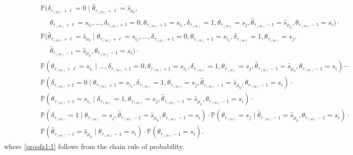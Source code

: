 \documentclass[journal,twoside,web]{ieeecolor}
\begin{document}
\begin{figure*}[ht]
\begin{align}
\begin{aligned}
& \qquad\quad~~~\! \mathbb{P}(\delta_{\tau_{(m)}+\ell}=0 \mid \hat{\theta}_{\tau_{(m)}+\ell} = \hat{s}_{\nu_{0}}, \\
& \qquad\qquad\quad\! \theta_{\tau_{(m)}+\ell}=s_{i_{\ell}},\dots,
\delta_{\tau_{(m)}+1}=0,\theta_{\tau_{(m)}+1}=s_{i_{1}},\delta_{\tau_{(m)}}=1,\theta_{\tau_{(m)}}=s_j,\hat{\theta}_{\tau_{(m)}-1} = \hat{s}_{\mu_0}, \theta_{\tau_{(m)}-1}=s_i) \cdot \\
& \qquad\quad~~~\! \mathbb{P}(\hat{\theta}_{\tau_{(m)}+\ell} = \hat{s}_{\nu_{0}} \mid \theta_{\tau_{(m)}+\ell}=s_{i_{\ell}},\dots,
\delta_{\tau_{(m)}+1}=0,\theta_{\tau_{(m)}+1}=s_{i_{1}},\delta_{\tau_{(m)}}=1,\theta_{\tau_{(m)}}=s_j,\\
& \qquad\qquad\quad\! \hat{\theta}_{\tau_{(m)}-1} = \hat{s}_{\mu_0}, \theta_{\tau_{(m)}-1}=s_i) \cdot \\
& \qquad\quad~~~\! \mathbb{P}(\theta_{\tau_{(m)}+\ell}=s_{i_{\ell}} \mid \dots, \delta_{\tau_{(m)}+1}=0,\theta_{\tau_{(m)}+1}=s_{i_{1}},\delta_{\tau_{(m)}}=1,\theta_{\tau_{(m)}}=s_j,\hat{\theta}_{\tau_{(m)}-1} = \hat{s}_{\mu_0}, \theta_{\tau_{(m)}-1}=s_i) \cdots \\
& \qquad\quad~~~\! \mathbb{P}(\delta_{\tau_{(m)}+1}=0 \mid \theta_{\tau_{(m)}+1}=s_{i_{1}},\delta_{\tau_{(m)}}=1,\theta_{\tau_{(m)}}=s_j,\hat{\theta}_{\tau_{(m)}-1} = \hat{s}_{\mu_0}, \theta_{\tau_{(m)}-1}=s_i) \cdot \\
& \qquad\quad~~~\! \mathbb{P}(\theta_{\tau_{(m)}+1}=s_{i_{1}} \mid \delta_{\tau_{(m)}}=1,\theta_{\tau_{(m)}}=s_j,\hat{\theta}_{\tau_{(m)}-1} = \hat{s}_{\mu_0}, \theta_{\tau_{(m)}-1}=s_i) \cdot \\
& \qquad\quad~~~\! \mathbb{P}(\delta_{\tau_{(m)}}=1 \mid \theta_{\tau_{(m)}}=s_j,\hat{\theta}_{\tau_{(m)}-1} = \hat{s}_{\mu_0}, \theta_{\tau_{(m)}-1}=s_i) \cdot
\mathbb{P}(\theta_{\tau_{(m)}}=s_j \mid \hat{\theta}_{\tau_{(m)}-1} = \hat{s}_{\mu_0}, \theta_{\tau_{(m)}-1}=s_i) \cdot \\
& \qquad\quad~~~\! \mathbb{P}(\hat{\theta}_{\tau_{(m)}-1} = \hat{s}_{\mu_0} \mid \theta_{\tau_{(m)}-1}=s_i) \cdot
\mathbb{P}(\theta_{\tau_{(m)}-1}=s_i).
\end{aligned}
\end{align}
where \eqref{proofz1:1} follows from the chain rule of probability.
\end{figure*}
\end{document}
